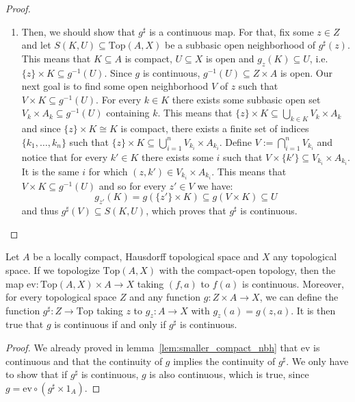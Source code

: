 \begin{proof}
\begin{enumerate}
\begin{enumerate}
\item Then, we should show that $g^{\sharp}$ is a continuous map. For that, fix some $z\in Z$ and let $S(K,U)\subseteq\mathrm{Top}(A,X)$ be a subbasic open neighborhood of $g^{\sharp}(z)$. This means that $K\subseteq A$ is compact, $U\subseteq X$ is open and $g_z(K)\subseteq U$, i.e. $\{z\}\times K\subseteq g^{-1}(U)$. Since $g$ is continuous, $g^{-1}(U)\subseteq Z\times A$ is open. Our next goal is to find some open neighborhood $V$ of $z$ such that $V\times K\subseteq g^{-1}(U)$. For every $k\in K$ there exists some subbasic open set $V_k\times A_k\subseteq g^{-1}(U)$ containing $k$. This means that $\{z\}\times K\subseteq\bigcup_{k\in K}V_k\times A_k$ and since $\{z\}\times K\cong K$ is compact, there exists a finite set of indices $\{k_1,\ldots,k_n\}$ such that $\{z\}\times K\subseteq\bigcup_{i=1}^nV_{k_i}\times A_{k_i}$. Define $V:=\bigcap_{i=1}^nV_{k_i}$ and notice that for every $k'\in K$ there exists some $i$ such that $V\times\{k'\}\subseteq V_{k_i}\times A_{k_i}$. It is the same $i$ for which $(z,k')\in V_{k_i}\times A_{k_i}$. This means that $V\times K\subseteq g^{-1}(U)$ and so for every $z'\in V$ we have:
\[g_{z'}(K)=g(\{z'\}\times K)\subseteq g(V\times K)\subseteq U\]
and thus $g^{\sharp}(V)\subseteq S(K,U)$, which proves that $g^{\sharp}$ is continuous.\qedhere
\end{enumerate}
\end{enumerate}
\end{proof}

\begin{corollary}\label{cor:exp_obj_prop} Let $A$ be a locally compact, Hausdorff topological space and $X$ any topological space. If we topologize $\mathrm{Top}(A,X)$ with the compact-open topology, then the map $\mathrm{ev}:\mathrm{Top}(A,X)\times A\to X$ taking $(f,a)$ to $f(a)$ is continuous. Moreover, for every topological space $Z$ and any function $g:Z\times A\to X$, we can define the function $g^{\sharp}:Z\to\mathrm{Top}$ taking $z$ to $g_z:A\to X$ with $g_z(a)=g(z,a)$. It is then true that $g$ is continuous if and only if $g^{\sharp}$ is continuous.
\end{corollary}
\begin{proof} We already proved in lemma~\ref{lem:smaller_compact_nbh} that $\mathrm{ev}$ is continuous and that the continuity of $g$ implies the continuity of $g^{\sharp}$. We only have to show that if $g^{\sharp}$ is continuous, $g$ is also continuous, which is true, since $g=\mathrm{ev}\circ(g^{\sharp}\times1_A)$.
\end{proof}

